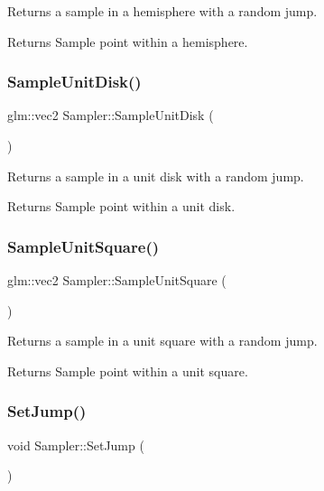 Returns a sample in a hemisphere with a random jump. \begin{DoxyReturn}{Returns}
Sample point within a hemisphere. 
\end{DoxyReturn}
\hypertarget{class_sampler_aea3eabc2048e29fe920c49aa35957cd5}{}\label{class_sampler_aea3eabc2048e29fe920c49aa35957cd5} 
\subsubsection{\texorpdfstring{Sample\+Unit\+Disk()}{SampleUnitDisk()}}
{\footnotesize\ttfamily glm\+::vec2 Sampler\+::\+Sample\+Unit\+Disk (\begin{DoxyParamCaption}{ }\end{DoxyParamCaption})}

Returns a sample in a unit disk with a random jump. \begin{DoxyReturn}{Returns}
Sample point within a unit disk. 
\end{DoxyReturn}
\hypertarget{class_sampler_a59fb62883540848f95e3b7655cf18cf6}{}\label{class_sampler_a59fb62883540848f95e3b7655cf18cf6} 
\subsubsection{\texorpdfstring{Sample\+Unit\+Square()}{SampleUnitSquare()}}
{\footnotesize\ttfamily glm\+::vec2 Sampler\+::\+Sample\+Unit\+Square (\begin{DoxyParamCaption}{ }\end{DoxyParamCaption})}

Returns a sample in a unit square with a random jump. \begin{DoxyReturn}{Returns}
Sample point within a unit square. 
\end{DoxyReturn}
\hypertarget{class_sampler_adb58ad84344a6422c6d9096c7f1fabf6}{}\label{class_sampler_adb58ad84344a6422c6d9096c7f1fabf6} 
\subsubsection{\texorpdfstring{Set\+Jump()}{SetJump()}}
{\footnotesize\ttfamily void Sampler\+::\+Set\+Jump (\begin{DoxyParamCaption}{ }\end{DoxyParamCaption})\hspace{0.3cm}{\ttfamily [protected]}}

